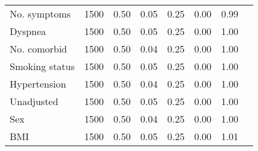 \documentclass{article}
\begin{document}
{\begin{longtable}{lccccccc}
No. symptoms & 1500 & 0.50 & 0.05 & 0.25 & 0.00 & 0.99 \\ 
Dyspnea & 1500 & 0.50 & 0.05 & 0.25 & 0.00 & 1.00 \\ 
No. comorbid & 1500 & 0.50 & 0.04 & 0.25 & 0.00 & 1.00 \\ 
Smoking status & 1500 & 0.50 & 0.05 & 0.25 & 0.00 & 1.00 \\ 
Hypertension & 1500 & 0.50 & 0.04 & 0.25 & 0.00 & 1.00 \\ 
Unadjusted & 1500 & 0.50 & 0.05 & 0.25 & 0.00 & 1.00 \\ 
Sex & 1500 & 0.50 & 0.04 & 0.25 & 0.00 & 1.00 \\ 
BMI & 1500 & 0.50 & 0.05 & 0.25 & 0.00 & 1.01 \\
\bottomrule
\hline
\end{longtable}
}

\clearpage
\end{document}
